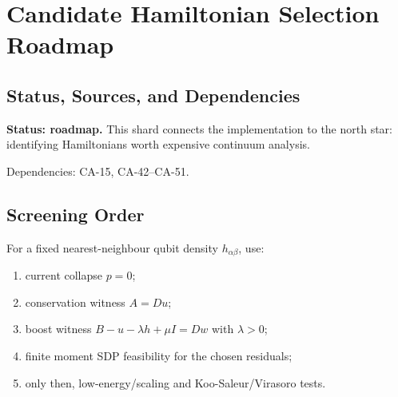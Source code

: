 
\section{Candidate Hamiltonian Selection Roadmap}
\label{sec:qubit-candidate-selection-roadmap}

\subsection{Status, Sources, and Dependencies}

\textbf{Status: roadmap.}  This shard connects the implementation to the north
star: identifying Hamiltonians worth expensive continuum analysis.

Dependencies: CA-15, CA-42--CA-51.


\subsection{Screening Order}

For a fixed nearest-neighbour qubit density \(h_{\alpha\beta}\), use:

\begin{enumerate}
\item current collapse \(p=0\);
\item conservation witness \(A=Du\);
\item boost witness \(B-u-\lambda h+\mu I=Dw\) with \(\lambda>0\);
\item finite moment SDP feasibility for the chosen residuals;
\item only then, low-energy/scaling and Koo-Saleur/Virasoro tests.
\end{enumerate}

